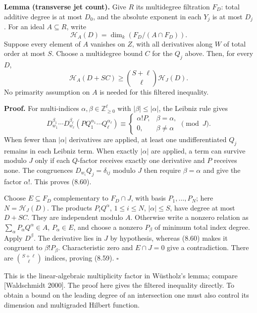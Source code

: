 \documentclass[
  11pt,
  a4paper,
]{article}
\begin{document}
\textbf{Lemma (transverse jet count).} Give \(R\) its multidegree
filtration \(F_D\): total additive degree is at most \(D_0\), and the
absolute exponent in each \(Y_j\) is at most \(D_j\). For an ideal
\(A\subseteq R\), write \[
\mathcal H_A(D)=\dim_k(F_D/(A\cap F_D)).
\] Suppose every element of \(A\) vanishes on \(Z\), with all
derivatives along \(W\) of total order at most \(S\). Choose a
multidegree bound \(C\) for the \(Q_j\) above. Then, for every \(D\), \[
\mathcal H_A(D+SC)\ge
\binom{S+\ell}{\ell}\mathcal H_J(D).
\tag{8.59}
\] No primarity assumption on \(A\) is needed for this filtered
inequality.

\textbf{Proof.} For multi-indices
\(\alpha,\beta\in\mathbb Z_{\ge0}^{\ell}\) with \(|\beta|\le|\alpha|\),
the Leibniz rule gives \[
D_{w_1}^{\beta_1}\cdots D_{w_\ell}^{\beta_\ell}
\left(PQ_1^{\alpha_1}\cdots Q_\ell^{\alpha_\ell}\right)
\equiv
\begin{cases}
\alpha!P,&\beta=\alpha,\\
0,&\beta\ne\alpha
\end{cases}
\pmod J.
\tag{8.60}
\] When fewer than \(|\alpha|\) derivatives are applied, at least one
undifferentiated \(Q_j\) remains in each Leibniz term. When exactly
\(|\alpha|\) are applied, a term can survive modulo \(J\) only if each
\(Q\)-factor receives exactly one derivative and \(P\) receives none.
The congruences \(D_{w_i}Q_j=\delta_{ij}\) modulo \(J\) then require
\(\beta=\alpha\) and give the factor \(\alpha!\). This proves (8.60).

Choose \(E\subseteq F_D\) complementary to \(F_D\cap J\), with basis
\(P_1,\ldots,P_N\); here \(N=\mathcal H_J(D)\). The products
\(P_iQ^\alpha\), \(1\le i\le N\), \(|\alpha|\le S\), have degree at most
\(D+SC\). They are independent modulo \(A\). Otherwise write a nonzero
relation as \(\sum_\alpha P_\alpha Q^\alpha\in A\), \(P_\alpha\in E\),
and choose a nonzero \(P_\beta\) of minimum total index degree. Apply
\(D^\beta\). The derivative lies in \(J\) by hypothesis, whereas (8.60)
makes it congruent to \(\beta!P_\beta\). Characteristic zero and
\(E\cap J=0\) give a contradiction. There are \(\binom{S+\ell}{\ell}\)
indices, proving (8.59). \(\square\)

This is the linear-algebraic multiplicity factor in Wüstholz's lemma;
compare {[}Waldschmidt 2000{]}. The proof here gives the filtered
inequality directly. To obtain a bound on the leading degree of an
intersection one must also control its dimension and multigraded Hilbert
function.
\end{document}
